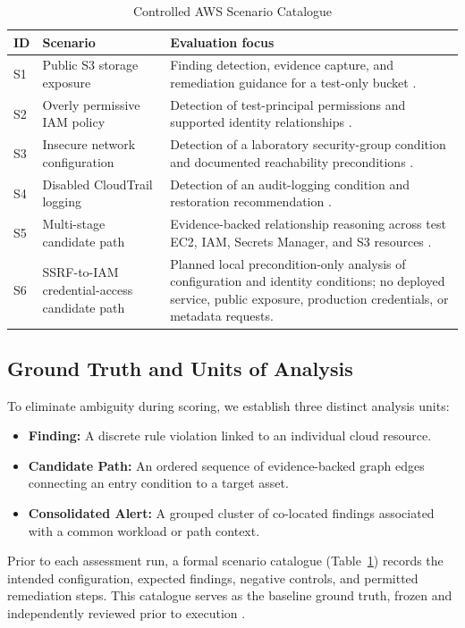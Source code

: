 \documentclass[conference]{IEEEtran}
\begin{document}
\begin{table}[t]
\caption{Controlled AWS Scenario Catalogue}
\label{tab:scenarios}
\centering
\begin{tabular}{p{} p{} p{}}
\toprule
ID & Scenario & Evaluation focus \\
\midrule
S1 & Public S3 storage exposure & Finding detection, evidence capture, and remediation guidance for a test-only bucket \cite{olorunlana2026s3}. \\
S2 & Overly permissive IAM policy & Detection of test-principal permissions and supported identity relationships \cite{vanede2022iam}. \\
S3 & Insecure network configuration & Detection of a laboratory security-group condition and documented reachability preconditions \cite{sabur2022scalable}. \\
S4 & Disabled CloudTrail logging & Detection of an audit-logging condition and restoration recommendation \cite{torkura2021multicloud}. \\
S5 & Multi-stage candidate path & Evidence-backed relationship reasoning across test EC2, IAM, Secrets Manager, and S3 resources \cite{elmiger2023attackpaths}. \\
S6 & SSRF-to-IAM credential-access candidate path & Planned local precondition-only analysis of configuration and identity conditions; no deployed service, public exposure, production credentials, or metadata requests. \\
\bottomrule
\end{tabular}
\end{table}

\subsection{Ground Truth and Units of Analysis}
To eliminate ambiguity during scoring, we establish three distinct analysis units:
\begin{itemize}
\item \textbf{Finding:} A discrete rule violation linked to an individual cloud resource.
\item \textbf{Candidate Path:} An ordered sequence of evidence-backed graph edges connecting an entry condition to a target asset.
\item \textbf{Consolidated Alert:} A grouped cluster of co-located findings associated with a common workload or path context.
\end{itemize}
Prior to each assessment run, a formal scenario catalogue (Table~\ref{tab:scenarios}) records the intended configuration, expected findings, negative controls, and permitted remediation steps. This catalogue serves as the baseline ground truth, frozen and independently reviewed prior to execution \cite{liu2024misconfigurations,rahman2023k8smisconfig}.
\end{document}

